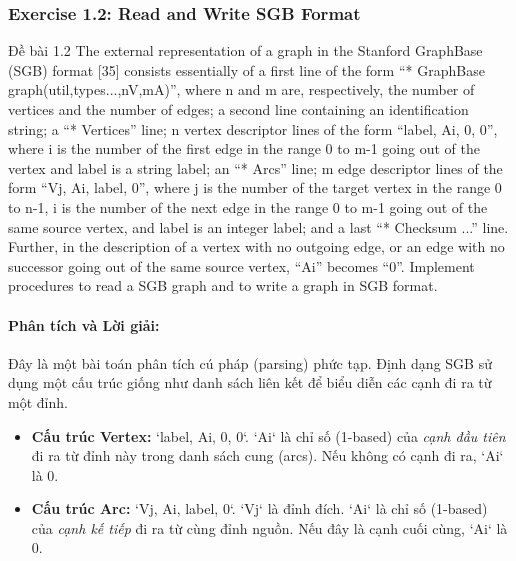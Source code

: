 \documentclass[a4paper,12pt]{article}
\begin{document}
\subsubsection{Exercise 1.2: Read and Write SGB Format}
\begin{problembox}{Đề bài 1.2}
    The external representation of a graph in the Stanford GraphBase (SGB) format [35] consists essentially of a first line of the form ``* GraphBase graph(util,types...,nV,mA)'', where n and m are, respectively, the number of vertices and the number of edges; a second line containing an identification string; a ``* Vertices'' line; n vertex descriptor lines of the form ``label, Ai, 0, 0'', where i is the number of the first edge in the range 0 to m-1 going out of the vertex and label is a string label; an ``* Arcs'' line; m edge descriptor lines of the form ``Vj, Ai, label, 0'', where j is the number of the target vertex in the range 0 to n-1, i is the number of the next edge in the range 0 to m-1 going out of the same source vertex, and label is an integer label; and a last ``* Checksum ...'' line. Further, in the description of a vertex with no outgoing edge, or an edge with no successor going out of the same source vertex, ``Ai'' becomes ``0''. Implement procedures to read a SGB graph and to write a graph in SGB format.
\end{problembox}

\paragraph{Phân tích và Lời giải:}
Đây là một bài toán phân tích cú pháp (parsing) phức tạp. Định dạng SGB sử dụng một cấu trúc giống như danh sách liên kết để biểu diễn các cạnh đi ra từ một đỉnh.
\begin{itemize}
    \item \textbf{Cấu trúc Vertex:} `label, Ai, 0, 0`. `Ai` là chỉ số (1-based) của \textit{cạnh đầu tiên} đi ra từ đỉnh này trong danh sách cung (arcs). Nếu không có cạnh đi ra, `Ai` là 0.
    \item \textbf{Cấu trúc Arc:} `Vj, Ai, label, 0`. `Vj` là đỉnh đích. `Ai` là chỉ số (1-based) của \textit{cạnh kế tiếp} đi ra từ cùng đỉnh nguồn. Nếu đây là cạnh cuối cùng, `Ai` là 0.
\end{itemize}
\end{document}
